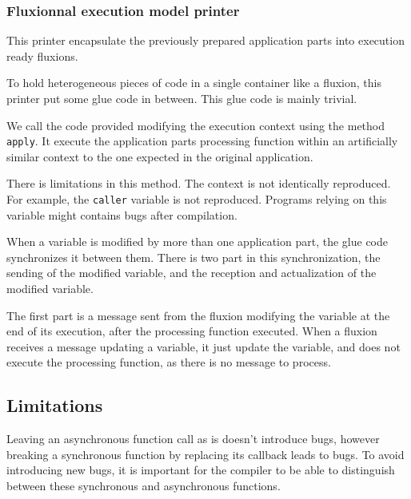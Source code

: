 \subsubsection{Fluxionnal execution model printer}

This printer encapsulate the previously prepared application parts into execution ready fluxions.

To hold heterogeneous pieces of code in a single container like a fluxion, this printer put some glue code in between.
This glue code is mainly trivial.

We call the code provided modifying the execution context using the method \texttt{apply}.
It execute the application parts processing function within an artificially similar context to the one expected in the original application.

There is limitations in this method.
The context is not identically reproduced.
For example, the \texttt{caller} variable is not reproduced.
Programs relying on this variable might contains bugs after compilation.




When a variable is modified by more than one application part, the glue code synchronizes it between them.
There is two part in this synchronization, the sending of the modified variable, and the reception and actualization of the modified variable.

The first part is a message sent from the fluxion modifying the variable at the end of its execution, after the processing function executed.
When a fluxion receives a message updating a variable, it just update the variable, and does not execute the processing function, as there is no message to process.











\subsection{Limitations} \label{ss:Limitations}

Leaving an asynchronous function call as is doesn't introduce bugs, however breaking a synchronous function by replacing its callback leads to bugs.
To avoid introducing new bugs, it is important for the compiler to be able to distinguish between these synchronous and asynchronous functions.

